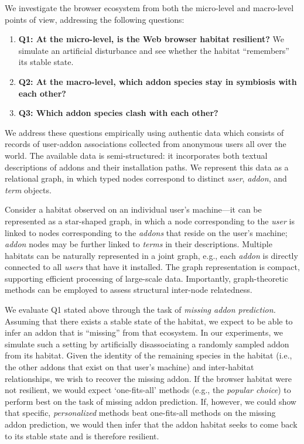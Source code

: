 \documentclass[ijoc,nonblindrev]{informs3} %
\numberwithin{equation}{subsection}
\begin{document}
We investigate the browser ecosystem from both the micro-level and macro-level points of view, addressing the following questions:\\
\begin{enumerate}
\item \textbf{Q1: At the micro-level, is the Web browser habitat resilient?} We simulate an artificial disturbance and see whether the habitat ``remembers'' its stable state.
\item \textbf{Q2: At the macro-level, which addon species stay in symbiosis with each other?}
\item \textbf{Q3: Which addon species clash with each other?}
\end{enumerate}

We address these questions empirically using authentic data which consists of records of user-addon associations collected from anonymous users all over the world. The available data is semi-structured: it incorporates both textual descriptions of addons and their installation paths. We represent this data as a relational graph, in which typed nodes correspond to distinct {\it user}, {\it addon}, and {\it term} objects. 

Consider a habitat observed on an individual user's machine---it can be represented as a star-shaped graph, in which a node corresponding to the \emph{user} is linked to nodes corresponding to the \emph{addons} that reside on the user's machine; {\it addon} nodes may be further linked to  {\it terms} in their descriptions. Multiple habitats can be naturally represented in a joint graph, e.g., each {\it addon} is directly connected to all {\it users} that have it installed. The graph representation is compact, supporting efficient processing of large-scale data. Importantly, graph-theoretic methods can be employed to assess structural inter-node relatedness. 

We evaluate Q1 stated above through the task of {\it missing addon prediction.} Assuming that there exists a stable state of the habitat, we expect to be able to infer an addon that is ``missing'' from that ecosystem. In our experiments, we simulate such a setting by artificially disassociating a randomly sampled addon from its habitat. Given the identity of the remaining species in the habitat (i.e., the other addons that exist on that user's machine) and inter-habitat relationships, we wish to recover the missing addon. If the browser habitat were not resilient, we would expect `one-fits-all' methods (e.g., the \emph{popular choice}) to perform best on the task of missing addon prediction. If, however, we could show that specific, \emph{personalized} methods beat one-fits-all methods on the missing addon prediction, we would then infer that the addon habitat seeks to come back to its stable state and is therefore resilient. 
\end{document}
